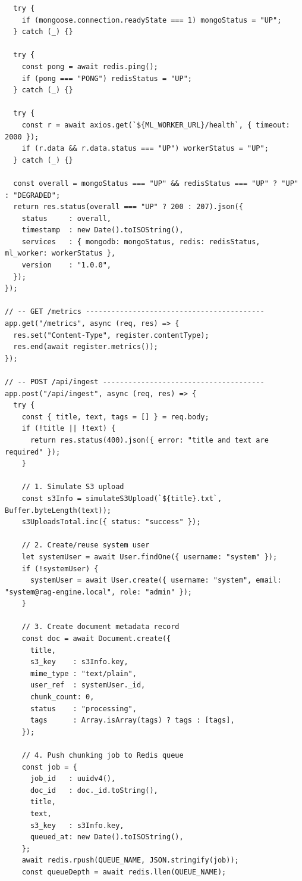 \documentclass[12pt,a4paper]{report}
\begin{document}
\begin{lstlisting}
  try {
    if (mongoose.connection.readyState === 1) mongoStatus = "UP";
  } catch (_) {}

  try {
    const pong = await redis.ping();
    if (pong === "PONG") redisStatus = "UP";
  } catch (_) {}

  try {
    const r = await axios.get(`${ML_WORKER_URL}/health`, { timeout: 2000 });
    if (r.data && r.data.status === "UP") workerStatus = "UP";
  } catch (_) {}

  const overall = mongoStatus === "UP" && redisStatus === "UP" ? "UP" : "DEGRADED";
  return res.status(overall === "UP" ? 200 : 207).json({
    status     : overall,
    timestamp  : new Date().toISOString(),
    services   : { mongodb: mongoStatus, redis: redisStatus, ml_worker: workerStatus },
    version    : "1.0.0",
  });
});

// -- GET /metrics ------------------------------------------
app.get("/metrics", async (req, res) => {
  res.set("Content-Type", register.contentType);
  res.end(await register.metrics());
});

// -- POST /api/ingest --------------------------------------
app.post("/api/ingest", async (req, res) => {
  try {
    const { title, text, tags = [] } = req.body;
    if (!title || !text) {
      return res.status(400).json({ error: "title and text are required" });
    }

    // 1. Simulate S3 upload
    const s3Info = simulateS3Upload(`${title}.txt`, Buffer.byteLength(text));
    s3UploadsTotal.inc({ status: "success" });

    // 2. Create/reuse system user
    let systemUser = await User.findOne({ username: "system" });
    if (!systemUser) {
      systemUser = await User.create({ username: "system", email: "system@rag-engine.local", role: "admin" });
    }

    // 3. Create document metadata record
    const doc = await Document.create({
      title,
      s3_key    : s3Info.key,
      mime_type : "text/plain",
      user_ref  : systemUser._id,
      chunk_count: 0,
      status    : "processing",
      tags      : Array.isArray(tags) ? tags : [tags],
    });

    // 4. Push chunking job to Redis queue
    const job = {
      job_id   : uuidv4(),
      doc_id   : doc._id.toString(),
      title,
      text,
      s3_key   : s3Info.key,
      queued_at: new Date().toISOString(),
    };
    await redis.rpush(QUEUE_NAME, JSON.stringify(job));
    const queueDepth = await redis.llen(QUEUE_NAME);


\end{lstlisting}
\end{document}
